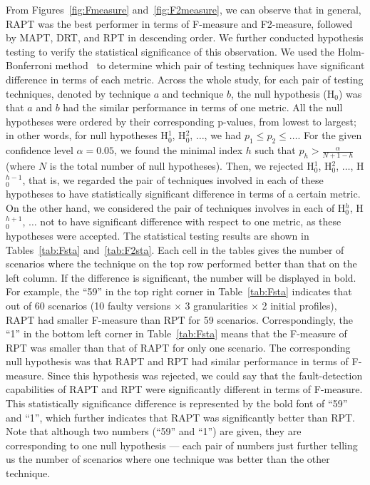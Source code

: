 \documentclass[10pt,journal,compsoc]{IEEEtran}
\begin{document}
\begin{figure*}[tp]
	\centering
	\caption{Boxplots of F2-measures on each object program}
	\label{fig:F2measure}
\end{figure*}

From Figures~\ref{fig:Fmeasure} and~\ref{fig:F2measure}, we can observe that in general, RAPT was the best performer in terms of F-measure and F2-measure, followed by MAPT, DRT, and RPT in descending order. We further conducted hypothesis testing to verify the statistical significance of this observation. We used the Holm-Bonferroni method~\cite{Holm79} to determine which pair of testing techniques have significant difference in terms of each metric. Across the whole study, for each pair of testing techniques, denoted by technique $a$ and technique $b$, the null hypothesis (H$_0$) was that $a$ and $b$ had the similar performance in terms of one metric. All the null hypotheses were ordered by their corresponding p-values, from lowest to largest; in other words, for null hypotheses H$_0^1$, H$_0^2$, $\ldots$, we had $p_1 \leq p_2 \leq \ldots$. For the given confidence level $\alpha = 0.05$, we found the minimal index $h$ such that $p_h > \displaystyle \frac{\alpha}{N+1-h}$ (where $N$ is the total number of null hypotheses). Then, we rejected H$_0^1$, H$_0^2$, $\ldots$, H$_0^{h-1}$, that is, we regarded the pair of techniques involved in each of these hypotheses to have statistically significant difference in terms of a certain metric. On the other hand, we considered the pair of techniques involves in each of H$_0^h$, H$_0^{h+1}$, $\ldots$ not to have significant difference with respect to one metric, as these hypotheses were accepted. The statistical testing results are shown in Tables~\ref{tab:Fsta} and~\ref{tab:F2sta}. Each cell in the tables gives the number of scenarios where the technique on the top row performed better than that on the left column. If the difference is significant, the number will be displayed in bold. For example, the ``59'' in the top right corner in Table~\ref{tab:Fsta} indicates that out of 60 scenarios (10 faulty versions $\times$ 3 granularities $\times$ 2 initial profiles), RAPT had smaller F-measure than RPT for 59 scenarios. Correspondingly, the ``1'' in the bottom left corner in Table~\ref{tab:Fsta} means that the F-measure of RPT was smaller than that of RAPT for only one scenario. The corresponding null hypothesis was that RAPT and RPT had similar performance in terms of F-measure. Since this hypothesis was rejected, we could say that the fault-detection capabilities of RAPT and RPT were significantly different in terms of F-measure. This statistically significance difference is represented by the bold font of ``59'' and ``1'', which further indicates that RAPT was significantly better than RPT. Note that although two numbers (``59'' and ``1'') are given, they are corresponding to one null hypothesis --- each pair of numbers just further telling us the number of scenarios where one technique was better than the other technique.
\end{document}

